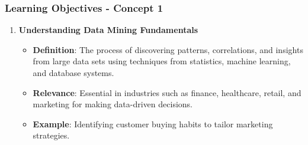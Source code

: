 \documentclass[aspectratio=169]{beamer}
\begin{document}
\begin{frame}[fragile]
    \frametitle{Learning Objectives - Concept 1}
    \begin{enumerate}
        \item \textbf{Understanding Data Mining Fundamentals}
        \begin{itemize}
            \item \textbf{Definition}: The process of discovering patterns, correlations, and insights from large data sets using techniques from statistics, machine learning, and database systems.
            \item \textbf{Relevance}: Essential in industries such as finance, healthcare, retail, and marketing for making data-driven decisions.
            \item \textbf{Example}: Identifying customer buying habits to tailor marketing strategies.
        \end{itemize} 
    \end{enumerate}
\end{frame}
\end{document}
